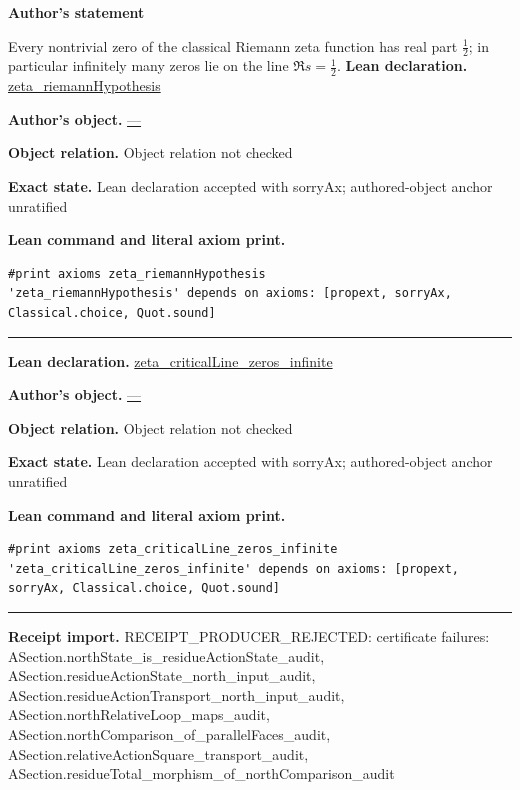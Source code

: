 \documentclass[11pt]{article}
\theoremstyle{plain}
\theoremstyle{definition}
\theoremstyle{remark}
\begin{document}
\begin{tcolorbox}[provenancecard,title={50. Corollary - Riemann Hypothesis},title after break={50. Corollary - Riemann Hypothesis (continued)}]
\textbf{Author's statement}\par
Every nontrivial zero of the classical Riemann zeta function has real part $\tfrac12$; in
particular infinitely many zeros lie on the line $\Re s=\tfrac12$.
\tcblower
\textbf{Lean declaration.} \url{zeta_riemannHypothesis}
\par\textbf{Author's object.} \url{—}
\par\textbf{Object relation.} Object relation not checked
\par\textbf{Exact state.} Lean declaration accepted with sorryAx; authored-object anchor unratified
\par\smallskip\textbf{Lean command and literal axiom print.}
\begin{Verbatim}[breaklines=true,breakanywhere=true,fontsize=\small]
#print axioms zeta_riemannHypothesis
'zeta_riemannHypothesis' depends on axioms: [propext, sorryAx, Classical.choice, Quot.sound]
\end{Verbatim}
\medskip\hrule\medskip
\textbf{Lean declaration.} \url{zeta_criticalLine_zeros_infinite}
\par\textbf{Author's object.} \url{—}
\par\textbf{Object relation.} Object relation not checked
\par\textbf{Exact state.} Lean declaration accepted with sorryAx; authored-object anchor unratified
\par\smallskip\textbf{Lean command and literal axiom print.}
\begin{Verbatim}[breaklines=true,breakanywhere=true,fontsize=\small]
#print axioms zeta_criticalLine_zeros_infinite
'zeta_criticalLine_zeros_infinite' depends on axioms: [propext, sorryAx, Classical.choice, Quot.sound]
\end{Verbatim}
\medskip\hrule\medskip
\textbf{Receipt import.} \textcolor{KgtRed}{RECEIPT\_PRODUCER\_REJECTED: certificate failures: ASection.northState\_is\_residueActionState\_audit, ASection.residueActionState\_north\_input\_audit, ASection.residueActionTransport\_north\_input\_audit, ASection.northRelativeLoop\_maps\_audit, ASection.northComparison\_of\_parallelFaces\_audit, ASection.relativeActionSquare\_transport\_audit, ASection.residueTotal\_morphism\_of\_northComparison\_audit}
\end{tcolorbox}
\medskip
\end{document}
